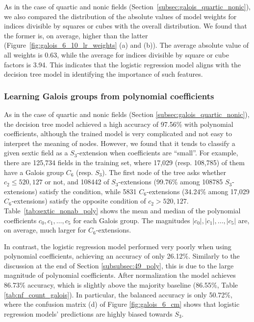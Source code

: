 \documentclass[letterpaper, 10pt]{article}
\newcommand{\1}{\mathds{1}}	%
\theoremstyle{definition}
\theoremstyle{remark}
\begin{document}
As in the case of quartic and nonic fields (Section~\ref{subsec:galois_quartic_nonic}), we also compared the distribution of the absolute values of model weights for indices divisible by squares or cubes with the overall distribution.  
We found that the former is, on average, higher than the latter (Figure~\ref{fig:galois_6_10_lr_weights} (a) and (b)).  
The average absolute value of all weights is  0.63, while the average for indices divisible by square or cube factors is  3.94.
This indicates that the logistic regression model aligns with the decision tree model in identifying the importance of such features.



\subsubsection{Learning Galois groups from polynomial coefficients}
\label{sec:sextic_poly}

As in the case of quartic and nonic fields (Section \ref{subsec:galois_quartic_nonic}), the decision tree model achieved a high accuracy of  97.56\% with polynomial coefficients, although the trained model is very complicated and not easy to interpret the meaning of nodes.
However, we found that it tends to classify a given sextic field as a $S_3$-extension when coefficients are ``small''.
For example, there are 125,734 fields in the training set, where 17,029 (resp. 108,785) of them have a Galois group $C_6$ (resp. $S_3$).
The first node of the tree asks whether $c_2 \le 520,127$ or not, and 108442 of $S_3$-extensions (99.76\% among 108785 $S_3$-extensions) satisfy the condition, while 5831 $C_6$-extensions (34.24\% among 17,029 $C_6$-extensions) satisfy the opposite condition of $c_2 > 520,127$.
Table~\ref{tab:sextic_nonab_poly} shows the mean and median of the polynomial coefficients \( c_0, c_1, \dots, c_5 \) for each Galois group.  
The magnitudes \( |c_0|, |c_1|, \dots, |c_5| \) are, on average, much larger for \( C_6 \)-extensions.

In contrast, the logistic regression model performed very poorly when using polynomial coefficients, achieving an accuracy of only  26.12\%. Similarly to the discussion at the end of Section \ref{subsubsec:49_poly}, this is due to the large magnitude of polynomial coefficients. After normalization the model achieves  86.73\% accuracy, which is slightly above the majority baseline (86.55\%, Table \ref{tab:nf_count_galois}). In particular, the balanced accuracy is only 50.72\%, where the confusion matrix (d) of Figure \ref{fig:galois_6_cm} shows that logistic regression models' predictions are highly biased towards $S_3$.
\end{document}
